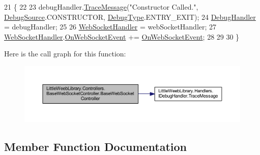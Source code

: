 \begin{DoxyCode}
21         \{
22 
23             debugHandler.\mbox{\hyperlink{interface_little_weeb_library_1_1_handlers_1_1_i_debug_handler_a2e405bc3492e683cd3702fae125221bc}{TraceMessage}}(\textcolor{stringliteral}{"Constructor Called."}, 
      \mbox{\hyperlink{namespace_little_weeb_library_1_1_handlers_a2a6ca0775121c9c503d58aa254d292be}{DebugSource}}.CONSTRUCTOR, \mbox{\hyperlink{namespace_little_weeb_library_1_1_handlers_ab66019ed40462876ec4e61bb3ccb0a62}{DebugType}}.ENTRY\_EXIT);
24             \mbox{\hyperlink{class_little_weeb_library_1_1_handlers_1_1_debug_handler}{DebugHandler}} = debugHandler;
25 
26             \mbox{\hyperlink{class_little_weeb_library_1_1_handlers_1_1_web_socket_handler}{WebSocketHandler}} = webSocketHandler;
27             \mbox{\hyperlink{class_little_weeb_library_1_1_handlers_1_1_web_socket_handler}{WebSocketHandler}}.\mbox{\hyperlink{class_little_weeb_library_1_1_handlers_1_1_web_socket_handler_a77ea6ec1d9b66676ebb1491cb42b3ec9}{OnWebSocketEvent}} += 
      \mbox{\hyperlink{class_little_weeb_library_1_1_controllers_1_1_base_web_socket_controller_a5344934da2b25a2ec1599b2ec86dd06e}{OnWebSocketEvent}};
28 
29 
30         \}
\end{DoxyCode}
Here is the call graph for this function\+:\nopagebreak
\begin{figure}[H]
\begin{center}
\leavevmode
\includegraphics[width=350pt]{class_little_weeb_library_1_1_controllers_1_1_base_web_socket_controller_a0e9c1d617d9de0f8b1aec72078a81b18_cgraph}
\end{center}
\end{figure}


\subsection{Member Function Documentation}
\mbox{\label{class_little_weeb_library_1_1_controllers_1_1_base_web_socket_controller_ae799e6c0e4c3ed0200b18a0360968ac8}} 
